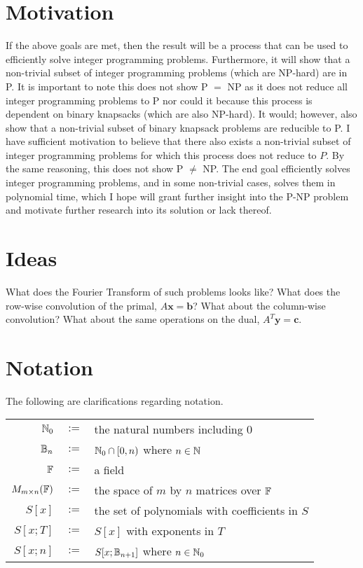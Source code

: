 \documentclass[conference]{IEEEtran}
\numberwithin{equation}{section}
\numberwithin{figure}{section}
\theoremstyle{plain}
\theoremstyle{definition}
\newcommand{\N}{\ensuremath \mathbb{N}}
\newcommand{\F}{\ensuremath \mathbb{F}}
\newcommand{\B}{\ensuremath \mathbb{B}}
\begin{document}
\section{Motivation}
If the above goals are met, then the result will be a process that can be used 
to efficiently solve integer programming problems. Furthermore, it will show that 
a non-trivial subset of integer programming problems (which are NP-hard) are in 
P. It is important to note this does not show P $=$ NP as it does not reduce all 
integer programming problems to P nor could it because this process is dependent 
on binary knapsacks (which are also NP-hard). It would; however, also show that a 
non-trivial subset of binary knapsack problems are reducible to P. I have 
sufficient motivation to believe that there also exists a non-trivial subset of 
integer programming problems for which this process does not reduce to $P$. By 
the same reasoning, this does not show P $\neq$ NP. The end goal efficiently 
solves integer programming problems, and in some non-trivial cases, solves them 
in polynomial time, which I hope will grant further insight into the P-NP 
problem and motivate further research into its solution or lack thereof. \\ \pagebreak

\section{Ideas}
What does the Fourier Transform of such problems looks like? What does the 
row-wise convolution of the primal, $A\mathbf{x} = \mathbf{b}$? What about the 
column-wise convolution? What about the same operations on the dual,
$A^T\mathbf{y} = \mathbf{c}$. \\

\section{Notation}
The following are clarifications regarding notation. \\
\begin{center}\begin{tabular}{rcl}
  $\N_0$               & $:=$ & the natural numbers including $0$               \\
  $\B_n$               & $:=$ & $\N_0 \cap [0,n)$ where $n \in \N$              \\
  $\F$                 & $:=$ & a field                                         \\
  $M_{m \times n}(\F)$ & $:=$ & the space of $m$ by $n$ matrices over $\F$      \\
  $S[x]$               & $:=$ & the set of polynomials with coefficients in $S$ \\
  $S[x;T]$             & $:=$ & $S[x]$ with exponents in $T$                    \\
  $S[x;n]$             & $:=$ & $S[x;\B_{n+1}]$ where $n \in \N_0$              \\
\end{tabular}\end{center}
\end{document}
